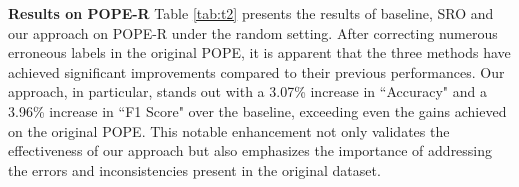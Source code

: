 \documentclass[10pt,twocolumn,letterpaper]{article}
\begin{document}
\noindent\textbf{Results on POPE-R} 
Table \ref{tab:t2} presents the results of baseline, SRO and our approach on POPE-R under the random setting. After correcting numerous erroneous labels in the original POPE, it is apparent that the three methods have achieved significant improvements compared to their previous performances. Our approach, in particular, stands out with a 3.07\% increase in ``Accuracy" and a 3.96\% increase in ``F1 Score" over the baseline, exceeding even the gains achieved on the original POPE. This notable enhancement not only validates the effectiveness of our approach but also emphasizes the importance of addressing the errors and inconsistencies present in the original dataset.



\end{document}
